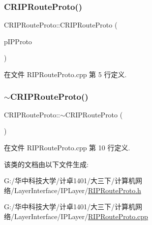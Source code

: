 \subsubsection{\texorpdfstring{C\+R\+I\+P\+Route\+Proto()}{CRIPRouteProto()}}
{\footnotesize\ttfamily C\+R\+I\+P\+Route\+Proto\+::\+C\+R\+I\+P\+Route\+Proto (\begin{DoxyParamCaption}\item[{\hyperlink{class_c_i_p_layer}{C\+I\+P\+Layer} $\ast$}]{p\+I\+P\+Proto }\end{DoxyParamCaption})}



在文件 R\+I\+P\+Route\+Proto.\+cpp 第 5 行定义.

\mbox{\label{class_c_r_i_p_route_proto_a848505ec34b13a32ac16444f45200138}} 
\subsubsection{\texorpdfstring{$\sim$\+C\+R\+I\+P\+Route\+Proto()}{~CRIPRouteProto()}}
{\footnotesize\ttfamily C\+R\+I\+P\+Route\+Proto\+::$\sim$\+C\+R\+I\+P\+Route\+Proto (\begin{DoxyParamCaption}{ }\end{DoxyParamCaption})}



在文件 R\+I\+P\+Route\+Proto.\+cpp 第 10 行定义.



该类的文档由以下文件生成\+:\begin{DoxyCompactItemize}
\item 
G\+:/华中科技大学/计卓1401/大三下/计算机网络/\+Layer\+Interface/\+I\+P\+Layer/\hyperlink{_r_i_p_route_proto_8h}{R\+I\+P\+Route\+Proto.\+h}\item 
G\+:/华中科技大学/计卓1401/大三下/计算机网络/\+Layer\+Interface/\+I\+P\+Layer/\hyperlink{_r_i_p_route_proto_8cpp}{R\+I\+P\+Route\+Proto.\+cpp}\end{DoxyCompactItemize}

